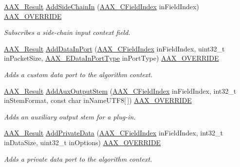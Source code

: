 \begin{DoxyCompactItemize}
\mbox{\hyperlink{a00392_a4d8f69a697df7f70c3a8e9b8ee130d2f}{A\+A\+X\+\_\+\+Result}} \mbox{\hyperlink{a01901_a9d3ad428d0b423e4aabba60eb76655c7}{Add\+Side\+Chain\+In}} (\mbox{\hyperlink{a00392_ae807f8986143820cfb5d6da32165c9c7}{A\+A\+X\+\_\+\+C\+Field\+Index}} in\+Field\+Index) \mbox{\hyperlink{a00392_ac2f24a5172689ae684344abdcce55463}{A\+A\+X\+\_\+\+O\+V\+E\+R\+R\+I\+DE}}
\begin{DoxyCompactList}\small\item\em Subscribes a side-\/chain input context field. \end{DoxyCompactList}\item 
\mbox{\hyperlink{a00392_a4d8f69a697df7f70c3a8e9b8ee130d2f}{A\+A\+X\+\_\+\+Result}} \mbox{\hyperlink{a01901_a1b2c3ae4de896e0f47a771ad8b1b5d08}{Add\+Data\+In\+Port}} (\mbox{\hyperlink{a00392_ae807f8986143820cfb5d6da32165c9c7}{A\+A\+X\+\_\+\+C\+Field\+Index}} in\+Field\+Index, uint32\+\_\+t in\+Packet\+Size, \mbox{\hyperlink{a00491_ab5677b173ad8647c24d34d28272d11fc}{A\+A\+X\+\_\+\+E\+Data\+In\+Port\+Type}} in\+Port\+Type) \mbox{\hyperlink{a00392_ac2f24a5172689ae684344abdcce55463}{A\+A\+X\+\_\+\+O\+V\+E\+R\+R\+I\+DE}}
\begin{DoxyCompactList}\small\item\em Adds a custom data port to the algorithm context. \end{DoxyCompactList}\item 
\mbox{\hyperlink{a00392_a4d8f69a697df7f70c3a8e9b8ee130d2f}{A\+A\+X\+\_\+\+Result}} \mbox{\hyperlink{a01901_a51525dd1833baa062d840d7df7225305}{Add\+Aux\+Output\+Stem}} (\mbox{\hyperlink{a00392_ae807f8986143820cfb5d6da32165c9c7}{A\+A\+X\+\_\+\+C\+Field\+Index}} in\+Field\+Index, int32\+\_\+t in\+Stem\+Format, const char in\+Name\+U\+T\+F8\mbox{[}$\,$\mbox{]}) \mbox{\hyperlink{a00392_ac2f24a5172689ae684344abdcce55463}{A\+A\+X\+\_\+\+O\+V\+E\+R\+R\+I\+DE}}
\begin{DoxyCompactList}\small\item\em Adds an auxiliary output stem for a plug-\/in. \end{DoxyCompactList}\item 
\mbox{\hyperlink{a00392_a4d8f69a697df7f70c3a8e9b8ee130d2f}{A\+A\+X\+\_\+\+Result}} \mbox{\hyperlink{a01901_ac1f89d2b73347438a79d21c589e4ff63}{Add\+Private\+Data}} (\mbox{\hyperlink{a00392_ae807f8986143820cfb5d6da32165c9c7}{A\+A\+X\+\_\+\+C\+Field\+Index}} in\+Field\+Index, int32\+\_\+t in\+Data\+Size, uint32\+\_\+t in\+Options) \mbox{\hyperlink{a00392_ac2f24a5172689ae684344abdcce55463}{A\+A\+X\+\_\+\+O\+V\+E\+R\+R\+I\+DE}}
\begin{DoxyCompactList}\small\item\em Adds a private data port to the algorithm context. \end{DoxyCompactList}\item 

\end{DoxyCompactItemize}
